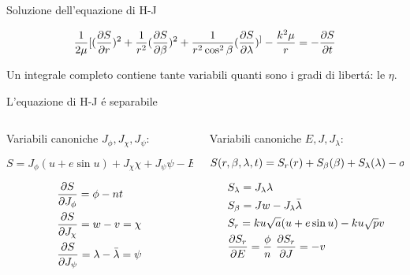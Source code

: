 \begin{frame}{Soluzione dell'equazione di H-J}

\begin{align*}
\frac{1}{2\mu}[(\PDy{r}{S})^2+\frac{1}{r^2}(\PDy{\beta}{S})^2+\frac{1}{r^2\cos^2{\beta}}(\PDy{\lambda}{S})^]-\frac{k^2\mu}{r}=-\PDy{t}{S}
\end{align*}

Un integrale completo contiene tante variabili quanti sono i gradi di libert\'a: le $\eta$.

\begin{block}{L'equazione di H-J \'e separabile}

\begin{columns}

\begin{column}{0.5\textwidth}

Variabili canoniche $J_{\phi}, J_{\chi}, J_{\psi}$:

\begin{equation*}
S=J_{\phi}(u+e\sin{u})+J_{\chi}\chi+J_{\psi}\psi-Et
\end{equation*}

\begin{align*}
&\PDy{J_{\phi}}{S}=\phi-nt\\
&\PDy{J_{\chi}}{S}=w-v=\chi\\
&\PDy{J_{\psi}}{S}=\lambda-\bar{\lambda}=\psi
\end{align*}


\end{column}

\begin{column}{0.5\textwidth}

Variabili canoniche $E, J, J_{\lambda}$:

\begin{equation*}
S(r,\beta,\lambda,t)=S_r(r)+S_{\beta}(\beta)+S_{\lambda}(\lambda)-\sigma t\\
\end{equation*}

\begin{align*}
&S_{\lambda}=J_{\lambda}\lambda\\
&S_{\beta}=Jw-J_{\lambda}\bar{\lambda}\\
&S_r=ku\sqrt{a}(u+e\sin{u})-ku\sqrt{p}v\\
&\PDy{E}{S_r}=\frac{\phi}{n} \ \PDy{J}{S_r}=-v
\end{align*}

\end{column}

\end{columns}



\end{block}


\end{frame}


